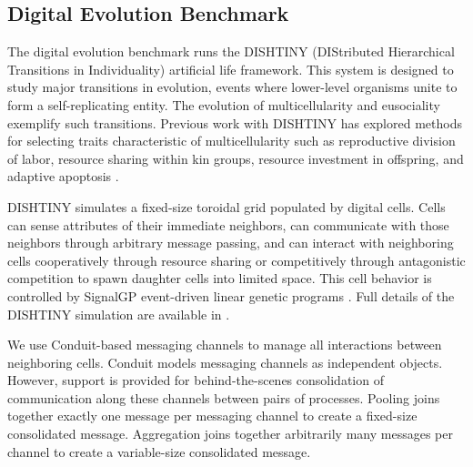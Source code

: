 \subsection{ Digital Evolution Benchmark } \label{sec:digital_evolution_benchmark}

The digital evolution benchmark runs the DISHTINY (DIStributed Hierarchical Transitions in Individuality) artificial life framework.
This system is designed to study major transitions in evolution, events where lower-level organisms unite to form a self-replicating entity.
The evolution of multicellularity and eusociality exemplify such transitions.
Previous work with DISHTINY has explored methods for selecting traits characteristic of multicellularity such as reproductive division of labor, resource sharing within kin groups, resource investment in offspring, and adaptive apoptosis \citep{moreno2019toward}.

DISHTINY simulates a fixed-size toroidal grid populated by digital cells.
Cells can sense attributes of their immediate neighbors, can communicate with those neighbors through arbitrary message passing, and can interact with neighboring cells cooperatively through resource sharing or competitively through antagonistic competition to spawn daughter cells into limited space.
This cell behavior is controlled by SignalGP event-driven linear genetic programs \citep{lalejini2018evolving}.
Full details of the DISHTINY simulation are available in \citep{moreno2021exploring}.

We use Conduit-based messaging channels to manage all interactions between neighboring cells.
Conduit models messaging channels as independent objects.
However, support is provided for behind-the-scenes consolidation of communication along these channels between pairs of processes.
Pooling joins together exactly one message per messaging channel to create a fixed-size consolidated message.
Aggregation joins together arbitrarily many messages per channel  to  create a variable-size consolidated message.

